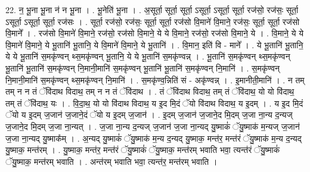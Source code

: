 \documentclass[17pt]{extarticle}
\begin{document}
22. न॒ भू॒ना भू॒ना न॑ न भू॒ना । . भू॒नेति॑ भू॒ना । . अ॒सूर्ता॒ सूर्ता॒ सूर्ता॒ ऽसूर्ता॒ ऽसूर्ता॒ सूर्ता॒ रज॑सो॒ रज॑सः॒ सूर्ता॒ ऽसूर्ता॒ ऽसूर्ता॒ सूर्ता॒ रज॑सः । . सूर्ता॒ रज॑सो॒ रज॑सः॒ सूर्ता॒ सूर्ता॒ रज॑सो वि॒माने॑ वि॒माने॒ रज॑सः॒ सूर्ता॒ सूर्ता॒ रज॑सो वि॒माने᳚ । . रज॑सो वि॒माने॑ वि॒माने॒ रज॑सो॒ रज॑सो वि॒माने॒ ये ये वि॒माने॒ रज॑सो॒ रज॑सो वि॒माने॒ ये । . वि॒माने॒ ये ये वि॒माने॑ वि॒माने॒ ये भू॒तानि॑ भू॒तानि॒ ये वि॒माने॑ वि॒माने॒ ये भू॒तानि॑ । . वि॒मान॒ इति॑ वि - माने᳚ । . ये भू॒तानि॑ भू॒तानि॒ ये ये भू॒तानि॑ स॒मकृ॑ण्वन् थ्स॒मकृ॑ण्वन् भू॒तानि॒ ये ये भू॒तानि॑ स॒मकृ॑ण्वन्न् । . भू॒तानि॑ स॒मकृ॑ण्वन् थ्स॒मकृ॑ण्वन् भू॒तानि॑ भू॒तानि॑ स॒मकृ॑ण्वन् नि॒मानी॒मानि॑ स॒मकृ॑ण्वन् भू॒तानि॑ भू॒तानि॑ स॒मकृ॑ण्वन् नि॒मानि॑ । . स॒मकृ॑ण्वन् नि॒मानी॒मानि॑ स॒मकृ॑ण्वन् थ्स॒मकृ॑ण्वन् नि॒मानि॑ । . स॒मकृ॑ण्व॒न्निति॑ सं - अकृ॑ण्वन्न् । . इ॒मानीती॒मानि॑ । . न तम् तम् न न तं ॅवि॑दाथ विदाथ॒ तम् न न तं ॅवि॑दाथ । . तं ॅवि॑दाथ विदाथ॒ तम् तं ॅवि॑दाथ॒ यो यो वि॑दाथ॒ तम् तं ॅवि॑दाथ॒ यः । . वि॒दा॒थ॒ यो यो वि॑दाथ विदाथ॒ य इ॒द मि॒दं ॅयो वि॑दाथ विदाथ॒ य इ॒दम् । . य इ॒द मि॒दं ॅयो य इ॒दम् ज॒जान॑ ज॒जाने॒दं ॅयो य इ॒दम् ज॒जान॑ । . इ॒दम् ज॒जान॑ ज॒जाने॒द मि॒दम् ज॒जा ना॒न्य द॒न्यज् ज॒जाने॒द मि॒दम् ज॒जा ना॒न्यत् । . ज॒जा ना॒न्य द॒न्यज् ज॒जान॑ ज॒जा ना॒न्यद् यु॒ष्माकं॑ ॅयु॒ष्माक॑ म॒न्यज् ज॒जान॑ ज॒जा ना॒न्यद् यु॒ष्माक᳚म् । . अ॒न्यद् यु॒ष्माकं॑ ॅयु॒ष्माक॑ म॒न्य द॒न्यद् यु॒ष्माक॒ मन्त॑र॒ मन्त॑रं ॅयु॒ष्माक॑ म॒न्य द॒न्यद् यु॒ष्माक॒ मन्त॑रम् । . यु॒ष्माक॒ मन्त॑र॒ मन्त॑रं ॅयु॒ष्माकं॑ ॅयु॒ष्माक॒ मन्त॑रम् भवाति भवा॒ त्यन्त॑रं ॅयु॒ष्माकं॑ ॅयु॒ष्माक॒ मन्त॑रम् भवाति । . अन्त॑रम् भवाति भवा॒ त्यन्त॑र॒ मन्त॑रम् भवाति । \newline
\end{document}
